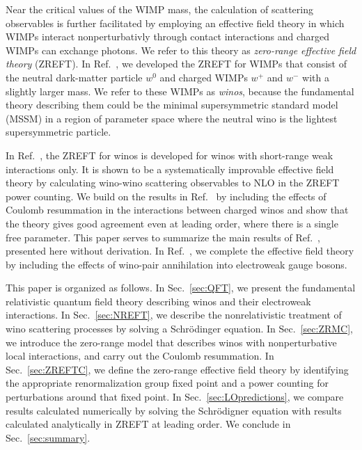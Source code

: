 \documentclass[%
 reprint,
 amsmath,amssymb,
 aps,
]{revtex4-1}
\begin{document}
Near the critical values of the WIMP mass, the calculation of scattering observables is further facilitated by employing an effective field theory in which WIMPs interact nonperturbativly through contact interactions and charged WIMPs can exchange photons.
We refer to this theory as {\it zero-range effective field theory} (ZREFT).
In Ref.~\cite{Braaten:2017gpq}, we developed the ZREFT for WIMPs that consist of the neutral dark-matter particle $w^0$ and charged WIMPs $w^+$ and $w^-$ with a slightly larger mass.
We refer to these WIMPs as {\it winos}, because the fundamental theory describing them could be the minimal supersymmetric standard model (MSSM) in a region of parameter space where the neutral wino is the lightest supersymmetric particle.


In Ref.~\cite{Braaten:2017gpq}, the ZREFT for winos is developed for winos with short-range weak interactions only.
It is shown to be a systematically improvable effective field theory by calculating wino-wino scattering observables to NLO in the ZREFT power counting.
We build on the results in Ref.~\cite{Braaten:2017gpq} by including the effects of Coulomb resummation in the interactions between charged winos and show that the theory gives good agreement even at leading order, where there is a single free parameter.
This paper serves to summarize the main results of Ref.~\cite{Braaten:2017kci}, presented here without derivation.
In Ref.~\cite{BJZ-Annihilation}, we complete the effective field theory by including the effects of wino-pair annihilation into electroweak gauge bosons.

This paper is organized as follows. 
In Sec.~\ref{sec:QFT}, we present the fundamental relativistic quantum field theory describing winos and their electroweak interactions.
In Sec.~\ref{sec:NREFT}, we describe the nonrelativistic treatment of wino scattering processes by solving a Schr\"odinger equation.
In Sec.~\ref{sec:ZRMC}, we introduce the zero-range model that describes winos with nonperturbative local interactions, and carry out the Coulomb resummation.
In Sec.~\ref{sec:ZREFTC}, we define the zero-range effective field theory by identifying the appropriate renormalization group fixed point and a power counting for perturbations around that fixed point.
In Sec.~\ref{sec:LOpredictions}, we compare results calculated numerically by solving the Schr\"odigner equation with results calculated analytically in ZREFT at leading order.
We conclude in Sec.~\ref{sec:summary}.

\end{document}
